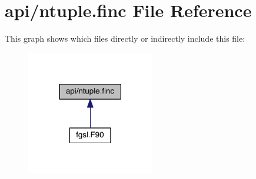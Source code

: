 \hypertarget{ntuple_8finc}{\section{api/ntuple.finc File Reference}
\label{ntuple_8finc}
}
This graph shows which files directly or indirectly include this file\-:
\nopagebreak
\begin{figure}[H]
\begin{center}
\leavevmode
\includegraphics[width=158pt]{ntuple_8finc__dep__incl}
\end{center}
\end{figure}
